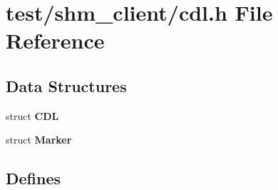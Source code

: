 \section{test/shm\_\-client/cdl.h File Reference}
\label{shm__client_2cdl_8h}
\subsection*{Data Structures}
\begin{CompactItemize}
\item 
struct \bf{CDL}
\item 
struct \bf{Marker}
\end{CompactItemize}
\subsection*{Defines}
